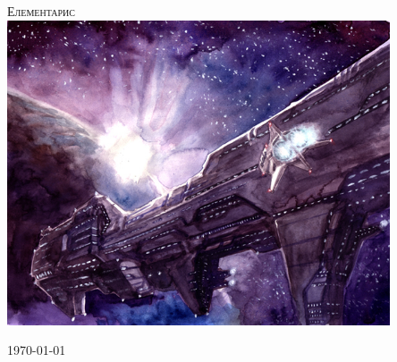\begin{titlepage}
\begin{center}

\textsc{\Huge Елементарис}\\[1.5cm]
\includegraphics[width=0.85\textwidth]{../images/spaceship1}~
\\[1cm]

\vfill

\today

\end{center}
\end{titlepage}
